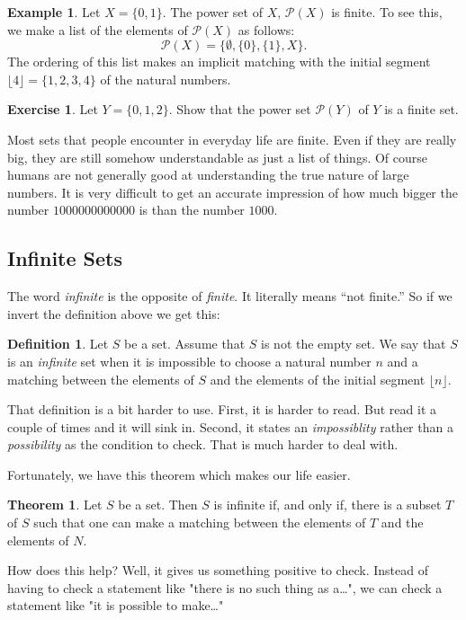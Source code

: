 \documentclass[12pt,letterpaper]{article}
\theoremstyle{definition}
\newtheorem{example}{Example}
\newtheorem{exercise}[question]{Exercise}
\newtheorem*{theorem}{Theorem}
\newtheorem*{definition}{Definition}
\begin{document}
\begin{example}
Let $X = \{ 0, 1\}$.
The power set of $X$, $\mathcal{P}(X)$ is finite.
To see this, we make a list of the elements of $\mathcal{P}(X)$ as follows:
\[
\mathcal{P}(X) = \{ \emptyset, \{0\}, \{1\}, X \} .
\]
The ordering of this list makes an implicit matching with the initial segment $\lfloor 4 \rfloor = \{ 1,  2, 3, 4\}$ of the natural numbers. 
\end{example}

\begin{exercise}
Let $Y = \{ 0, 1, 2 \}$. 
Show that the power set $\mathcal{P}(Y)$ of $Y$ is a finite set.
\end{exercise}

Most sets that people encounter in everyday life are finite.
Even if they are really big, they are still somehow understandable as just a list of things. 
Of course humans are not generally good at understanding the true nature of large numbers.
It is very difficult to get an accurate impression of how much bigger the number $1000000000000$ is than the number $1000$. 

\subsection*{Infinite Sets}

The word \emph{infinite} is the opposite of \emph{finite}. 
It literally means ``not finite.'' 
So if we invert the definition above we get this:
\begin{definition}
Let $S$ be a set. Assume that $S$ is not the empty set.
We say that $S$ is an \emph{infinite} set when it is impossible to choose a natural number $n$ and a matching between the elements of $S$ and the elements of the initial segment $\lfloor n \rfloor$.
\end{definition}
That definition is a bit harder to use.
First, it is harder to read.
But read it a couple of times and it will sink in.
Second, it states an \emph{impossiblity} rather than a \emph{possibility} as the condition to check. 
That is much harder to deal with.

Fortunately, we have this theorem which makes our life easier.
\begin{theorem}
Let $S$ be a set. Then $S$ is infinite if, and only if, there is a subset $T$ of $S$ such that one can make a matching between the elements of $T$ and the elements of $N$.
\end{theorem}

How does this help?
Well, it gives us something positive to check.
Instead of having to check a statement like "there is no such thing as a\dots", we can check a statement like "it is possible to make\dots"
\end{document}
